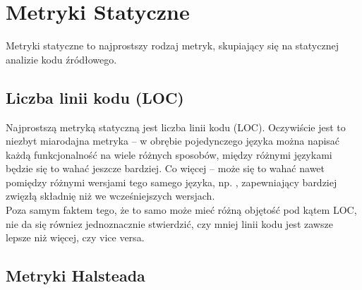 \section{Metryki Statyczne}
Metryki statyczne to najprostszy rodzaj metryk, skupiający się na statycznej analizie
kodu źródłowego.

\subsection*{Liczba linii kodu (LOC)}
Najprostszą metryką statyczną jest liczba linii kodu (LOC).
Oczywiście jest to niezbyt miarodajna metryka -- w obrębie pojedynczego języka można napisać
każdą funkcjonalność na wiele różnych sposobów, między różnymi językami będzie się to wahać jeszcze bardziej.
Co więcej -- może się to wahać nawet pomiędzy różnymi wersjami tego samego języka, np. \cite[\texttt{switch} w Javie 17]{jdk17switch},
zapewniający bardziej zwięzłą składnię niż we wcześniejszych wersjach. \\
Poza samym faktem tego, że to samo może mieć różną objętość pod kątem LOC, nie da się równiez jednoznacznie stwierdzić,
czy mniej linii kodu jest zawsze lepsze niż więcej, czy vice versa.

\subsection*{Metryki Halsteada}
\cite[dupa]{halstead}
